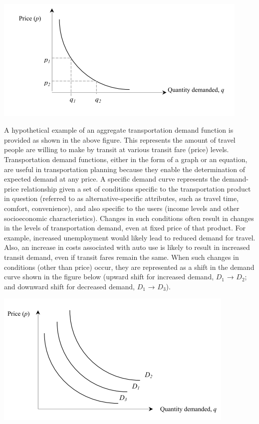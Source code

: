 \paragraph{}
\begin{center}
	\includegraphics{gfx/fig38.png}
\end{center}
A hypothetical example of an aggregate transportation demand function is provided as shown in the above figure. This represents the amount of travel people are willing to make by transit at various transit fare (price) levels. Transportation demand functions, either in the form of a graph or an equation, are useful in transportation planning because they enable the determination of expected demand at any price. A specific demand curve represents the demand-price relationship given a set of conditions specific to the transportation product in question (referred to as alternative-specific attributes, such as travel time, comfort, convenience), and also specific to the users (income levels and other socioeconomic characteristics). Changes in such conditions often result in changes in the levels of transportation demand, even at fixed price of that product. For example, increased unemployment would likely lead to reduced demand for travel. Also, an increase in costs associated with auto use is likely to result in increased transit demand, even if transit fares remain the same. When such changes in conditions (other than price) occur, they are represented as a shift in the demand curve shown in the figure below (upward shift for increased demand, $ D_1 $ → $ D_2 $; and downward shift for decreased demand, $ D_1 $ → $ D_3 $).
\begin{center}
	\includegraphics[scale=0.7]{gfx/fig39.png}
\end{center}
%
